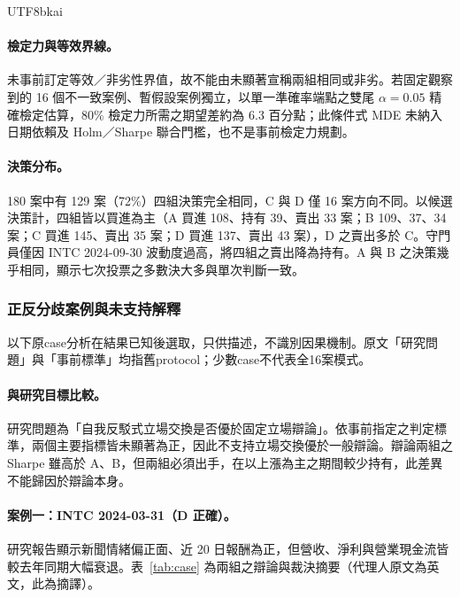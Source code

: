 \documentclass[12pt,a4paper]{article}
\newcommand{\grp}[1]{\textsf{#1}}
\begin{document}
\begin{CJK}{UTF8}{bkai}
\paragraph{檢定力與等效界線。} 未事前訂定等效／非劣性界值，故不能由未顯著宣稱兩組相同或非劣。若固定觀察到的 16 個不一致案例、暫假設案例獨立，以單一準確率端點之雙尾 $\alpha=0.05$ 精確檢定估算，80\% 檢定力所需之期望差約為 6.3 百分點；此條件式 MDE 未納入日期依賴及 Holm／Sharpe 聯合門檻，也不是事前檢定力規劃。

\paragraph{決策分布。} 180 案中有 129 案（72\%）四組決策完全相同，\grp{C} 與 \grp{D} 僅 16 案方向不同。以候選決策計，四組皆以買進為主（\grp{A} 買進 108、持有 39、賣出 33 案；\grp{B} 109、37、34 案；\grp{C} 買進 145、賣出 35 案；\grp{D} 買進 137、賣出 43 案），\grp{D} 之賣出多於 \grp{C}。守門員僅因 INTC 2024-09-30 波動度過高，將四組之賣出降為持有。\grp{A} 與 \grp{B} 之決策幾乎相同，顯示七次投票之多數決大多與單次判斷一致。
\subsubsection{正反分歧案例與未支持解釋}

以下原case分析在結果已知後選取，只供描述，不識別因果機制。原文「研究問題」與「事前標準」均指舊protocol；少數case不代表全16案模式。
\paragraph{與研究目標比較。} 研究問題為「自我反駁式立場交換是否優於固定立場辯論」。依事前指定之判定標準，兩個主要指標皆未顯著為正，因此不支持立場交換優於一般辯論。辯論兩組之 Sharpe 雖高於 \grp{A}、\grp{B}，但兩組必須出手，在以上漲為主之期間較少持有，此差異不能歸因於辯論本身。

\paragraph{案例一：INTC 2024-03-31（\grp{D} 正確）。} 研究報告顯示新聞情緒偏正面、近 20 日報酬為正，但營收、淨利與營業現金流皆較去年同期大幅衰退。表~\ref{tab:case} 為兩組之辯論與裁決摘要（代理人原文為英文，此為摘譯）。


\end{CJK}
\end{document}

